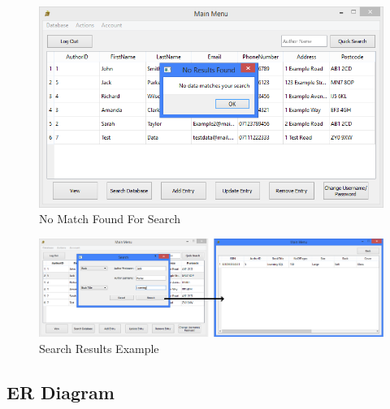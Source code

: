 \begin{figure}[H]
    \caption{No Match Found For Search} \label{fig:NoMatchSearch}
    \includegraphics[width=\textwidth]{./Maintenance/UserInterface/NoMatchSearch.png}
\end{figure}

\begin{figure}[H]
    \caption{Search Results Example} \label{fig:SearchExample}
    \includegraphics[width=\textwidth]{./Maintenance/UserInterface/SearchExample.png}
\end{figure}

\subsection{ER Diagram}

